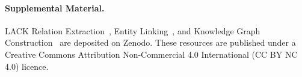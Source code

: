 \documentclass[runningheads]{llncs}
\newcommand{\todo}[1]{\textcolor{red}{\textbf{[TODO: #1]}}}
\begin{document}












\paragraph{Supplemental Material.}
LACK Relation Extraction~\cite{lack-re}, Entity Linking~\cite{lack-el}, and Knowledge Graph Construction~\cite{lack-kgc} are deposited on Zenodo.
These resources are published under a Creative Commons Attribution Non-Commercial 4.0 International (CC BY NC 4.0) licence.




\end{document}
